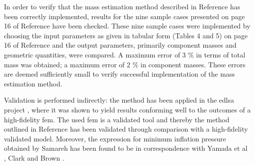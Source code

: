 In order to verify that the mass estimation method described in Reference \cite{Samareh2011} has been correctly implemented, results for the nine sample cases presented on page 16 of Reference \cite{Samareh2011} have been checked. These nine sample cases were implemented by choosing the input parameters as given in tabular form (Tables 4 and 5) on page 16 of Reference \cite{Samareh2011} and the output parameters, primarily component masses and geometric quantities, were compared. A maximum error of 3 $\%$ in terms of total mass was obtained; a maximum error of 2 $\%$ in component masses. These errors are deemed sufficiently small to verify successful implementation of the mass estimation method.

Validation is performed indirectly: the method \cite{Samareh2011} has been applied in the \gls{edlsa} project \cite{Cianciolo2010}, where it was shown to yield results conforming well to the outcomes of a high-fidelity \gls{fem}. The used \gls{fem} is a validated tool \cite{Cianciolo2010} and thereby the method outlined in Reference \cite{Samareh2011} has been validated through comparison with a high-fidelity validated model. Moreover, the expression for minimum inflation pressure obtained by Samareh has been found to be in correspondence with Yamada et al \cite{Yamada2009}, Clark \cite{Clark2009} and Brown \cite{Brown2009}.



